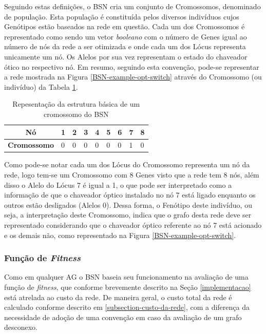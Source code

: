 Seguindo estas definições, o BSN cria um conjunto de Cromossomos, denominado de população. Esta população é constituída pelos diversos indivíduos cujos Genótipos estão baseados na rede em questão. Cada um dos Cromossomos é representado como sendo um vetor \emph{booleano} com o número de Genes igual ao número de nós da rede a ser otimizada e onde cada um dos Lócus representa unicamente um nó. Os Alelos por sua vez representam o estado do chaveador ótico no respectivo nó. Em resumo, seguindo esta convenção, pode-se representar a rede mostrada na Figura \ref{BSN-example-opt-switch} através do Cromossomo (ou indivíduo) da Tabela \ref{tab-cromossomo-bsn}.

\begin{table}[ht]
\centering
\begin{tabular}{|l|l|l|l|l|l|l|l|l|}
\hline
\multicolumn{1}{|c|}{\textbf{Nó}} & \multicolumn{1}{c|}{1} & 2 & 3 & 4 & 5 & 6 & 7 & 8 \\ \hline
\textbf{Cromossomo} & 0 & 0 & 0 & 0 & 0 & 0 & 1 & 0 \\ \hline
\end{tabular}
\caption[Cromossomo BSN]{Repesentação da estrutura básica de um cromossomo do BSN}
\label{tab-cromossomo-bsn}
\end{table}

Como pode-se notar cada um dos Lócus do Cromossomo representa um nó da rede, logo tem-se um Cromossomo com 8 Genes visto que a rede tem 8 nós, além disso o Alelo do Lócus 7 é igual a 1, o que pode ser interpretado como a informação de que o chaveador óptico instalado no nó 7 está ligado enquanto os outros estão desligados (Alelos 0). Dessa forma, o Fenótipo deste indivíduo, ou seja, a interpretação deste Cromossomo, indica que o grafo desta rede deve ser representado considerando que o chaveador óptico referente ao nó 7 está acionado e os demais não, como representado na Figura \ref{BSN-example-opt-switch}.

\subsubsection{Função de \emph{Fitness}}
\label{cap-fitness}
Como em qualquer AG o BSN baseia seu funcionamento na avaliação de uma função de \emph{fitness}, que conforme brevemente descrito na Seção \ref{implementacao} está atrelada ao custo da rede. De maneira geral, o custo total da rede é calculado conforme descrito em \ref{subsection-custo-da-rede}, com a diferença da necessidade de adoção de uma convenção em caso da avaliação de um grafo desconexo.

